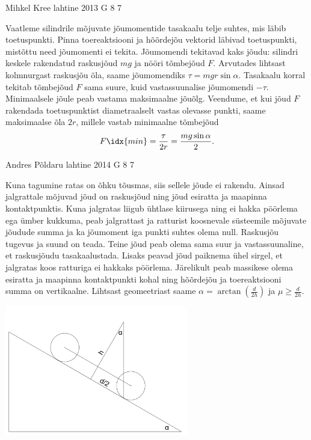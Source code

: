 \documentclass[11pt]{article}
\begin{document}
{%
{Mihkel Kree} %
{lahtine} %
{2013} %
{G 8} %
{7} %
{

\ifSolution
Vaatleme silindrile mõjuvate jõumomentide tasakaalu telje suhtes, mis läbib toetuspunkti. Pinna toereaktsiooni ja hõõrdejõu vektorid läbivad toetuspunkti, mistõttu need jõumomenti ei tekita. Jõumomendi tekitavad kaks jõudu: silindri keskele rakendatud raskusjõud $mg$ ja nööri tõmbejõud $F$. Arvutades lihtsast kolmnurgast raskusjõu õla, saame jõumomendiks $\tau=mgr\sin\alpha$. Tasakaalu korral tekitab tõmbejõud $F$ sama suure, kuid vastassuunalise jõumomendi $-\tau$. Minimaalsele jõule peab vastama maksimaalne jõuõlg. Veendume, et kui jõud $F$ rakendada toetuspunktist diametraalselt vastas olevasse punkti, saame maksimaalse õla $2r$, millele vastab minimaalne tõmbejõud
\[F\idx{min}=\frac{\tau}{2r}=\frac{mg\sin\alpha}{2}.\]
\fi
}

{Andres Põldaru} %
{lahtine} %
{2014} %
{G 8} %
{7} %
{

\ifSolution
Kuna tagumine ratas on õhku tõusmas, siis sellele jõude ei rakendu. Ainsad jalgrattale mõjuvad jõud on raskusjõud ning jõud esiratta ja maapinna kontaktpunktis. Kuna jalgratas liigub ühtlase kiirusega ning ei hakka pöörlema ega ümber kukkuma, peab jalgrattast ja ratturist koosnevale süsteemile mõjuvate jõudude summa ja ka jõumoment iga punkti suhtes olema null. Raskusjõu tugevus ja suund on teada. Teine jõud peab olema sama suur ja vastassuunaline, et raskusjõudu tasakaalustada. Lisaks peavad jõud paiknema ühel sirgel, et jalgratas koos ratturiga ei hakkaks pöörlema. Järelikult peab massikese olema esiratta ja maapinna kontaktpunkti kohal ning hõõrdejõu ja toereaktsiooni summa on vertikaalne. Lihtsast geomeetriast saame $\alpha=\arctan(\frac{d}{2h})$ ja $\mu\ge\frac{d}{2h}$.
\begin{center}
\includegraphics[width=0.6\textwidth]{2014-lahg-08-ratas}
\end{center}
\fi
}

}
\end{document}
